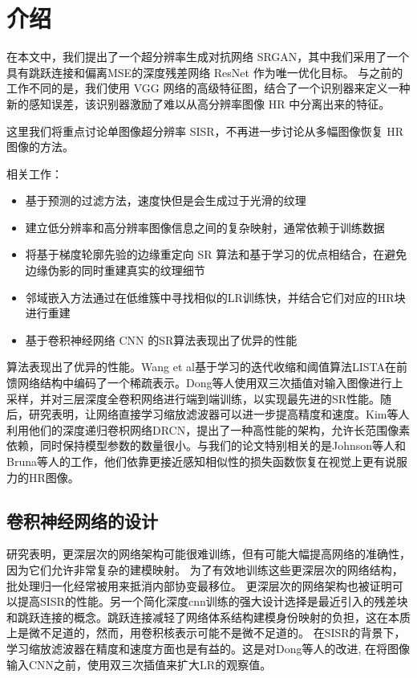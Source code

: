 \documentclass[UTF8,a4paper,10pt]{ctexrep}
\begin{document}
\section{介绍}
在本文中，我们提出了一个超分辨率生成对抗网络 SRGAN，其中我们采用了一个具有跳跃连接和偏离MSE的深度残差网络 ResNet 作为唯一优化目标。
与之前的工作不同的是，我们使用 VGG 网络的高级特征图，结合了一个识别器来定义一种新的感知误差，该识别器激励了难以从高分辨率图像 HR 中分离出来的特征。

这里我们将重点讨论单图像超分辨率 SISR，不再进一步讨论从多幅图像恢复 HR 图像的方法。

相关工作：
\begin{itemize}
  \item 基于预测的过滤方法，速度快但是会生成过于光滑的纹理
  \item 建立低分辨率和高分辨率图像信息之间的复杂映射，通常依赖于训练数据
  \item 将基于梯度轮廓先验的边缘重定向 SR 算法和基于学习的优点相结合，在避免边缘伪影的同时重建真实的纹理细节
  \item 邻域嵌入方法通过在低维簇中寻找相似的LR训练快，并结合它们对应的HR块进行重建
  \item 基于卷积神经网络 CNN 的SR算法表现出了优异的性能
\end{itemize}

算法表现出了优异的性能。Wang et al基于学习的迭代收缩和阈值算法LISTA在前馈网络结构中编码了一个稀疏表示。Dong等人使用双三次插值对输入图像进行上采样，并对三层深度全卷积网络进行端到端训练，以实现最先进的SR性能。随后，研究表明，让网络直接学习缩放滤波器可以进一步提高精度和速度。Kim等人利用他们的深度递归卷枳网络DRCN，提出了一种高性能的架构，允许长范围像素依赖，同时保持模型参数的数量很小。与我们的论文特别相关的是Johnson等人和Bruna等人的工作，他们依靠更接近感知相似性的损失函数恢复在视觉上更有说服力的HR图像。

\subsection{卷积神经网络的设计}
研究表明，更深层次的网络架构可能很难训练，但有可能大幅提高网络的准确性，因为它们允许非常复杂的建模映射。
为了有效地训练这些更深层次的网络结构，批处理归一化经常被用来抵消内部协变最移位。
更深层次的网络架构也被证明可以提高SISR的性能。另一个简化深度cnn训练的强大设计选择是最近引入的残差块和跳跃连接的概念。跳跃连接减轻了网络体系结构建模身份映射的负担，这在本质上是微不足道的，然而，用卷积核表示可能不是微不足道的。
在SISR的背景下，学习缩放滤波器在精度和速度方面也是有益的。这是对Dong等人的改进, 在将图像输入CNN之前，使用双三次插值来扩大LR的观察值。
\end{document}
